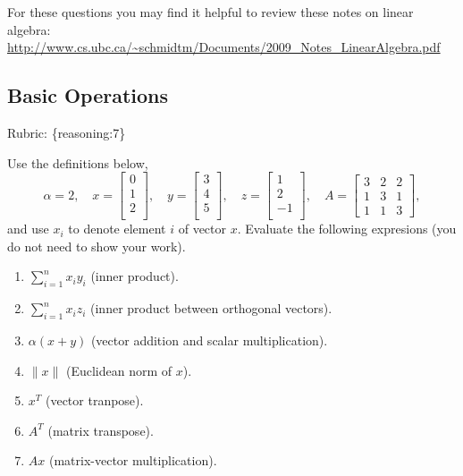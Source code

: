 \documentclass{article}
\def\rubric#1{\gre{Rubric: \{#1\}}}{}
\def\blu#1{{\color{blu}#1}}
\def\gre#1{{\color{gre}#1}}
\def\norm#1{\|#1\|}
\def\enum#1{\begin{enumerate}#1\end{enumerate}}
\begin{document}
For these questions you may find it helpful to review these notes on linear algebra:\\
\url{http://www.cs.ubc.ca/~schmidtm/Documents/2009_Notes_LinearAlgebra.pdf}

\subsection{Basic Operations}
\rubric{reasoning:7}

Use the definitions below,
\[
\alpha = 2,\quad
x = \left[\begin{array}{c}
0\\
1\\
2\\
\end{array}\right], \quad
y = \left[\begin{array}{c}
3\\
4\\
5\\
\end{array}\right],\quad
z = \left[\begin{array}{c}
1\\
2\\
-1\\
\end{array}\right],\quad
A = \left[\begin{array}{ccc}
3 & 2 & 2\\
1 & 3 & 1\\
1 & 1 & 3
\end{array}\right],
\]
and use $x_i$ to denote element $i$ of vector $x$.
\blu{Evaluate the following expresions} (you do not need to show your work).
\enum{
\item $\sum_{i=1}^n x_iy_i$ (inner product).
\item $\sum_{i=1}^n x_iz_i$ (inner product between orthogonal vectors).
\item $\alpha(x+y)$ (vector addition and scalar multiplication).
\item $\norm{x}$ (Euclidean norm of $x$).
\item $x^T$ (vector tranpose).
\item $A^T$ (matrix transpose).
\item $Ax$ (matrix-vector multiplication).
}
\end{document}
